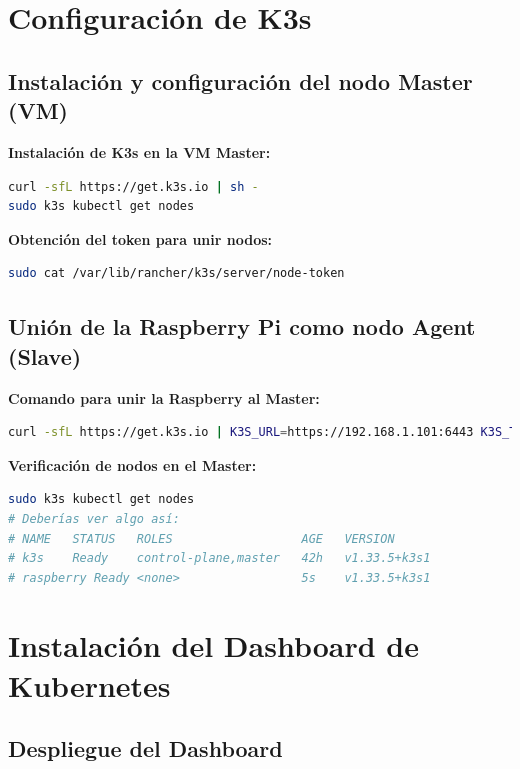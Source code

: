 \documentclass[12pt, a4paper]{article}
\begin{document}
\section{Configuración de K3s}

\subsection{Instalación y configuración del nodo Master (VM)}

\textbf{Instalación de K3s en la VM Master:}

\begin{lstlisting}[language=bash]
curl -sfL https://get.k3s.io | sh -
sudo k3s kubectl get nodes
\end{lstlisting}

\textbf{Obtención del token para unir nodos:}

\begin{lstlisting}[language=bash]
sudo cat /var/lib/rancher/k3s/server/node-token
\end{lstlisting}

\subsection{Unión de la Raspberry Pi como nodo Agent (Slave)}

\textbf{Comando para unir la Raspberry al Master:}

\begin{lstlisting}[language=bash]
curl -sfL https://get.k3s.io | K3S_URL=https://192.168.1.101:6443 K3S_TOKEN=<TOKEN_DEL_MASTER> sh -
\end{lstlisting}

\textbf{Verificación de nodos en el Master:}

\begin{lstlisting}[language=bash]
sudo k3s kubectl get nodes
# Deberías ver algo así:
# NAME   STATUS   ROLES                  AGE   VERSION
# k3s    Ready    control-plane,master   42h   v1.33.5+k3s1
# raspberry Ready <none>                 5s    v1.33.5+k3s1
\end{lstlisting}
\newpage

\section{Instalación del Dashboard de Kubernetes}

\subsection{Despliegue del Dashboard}
\end{document}
